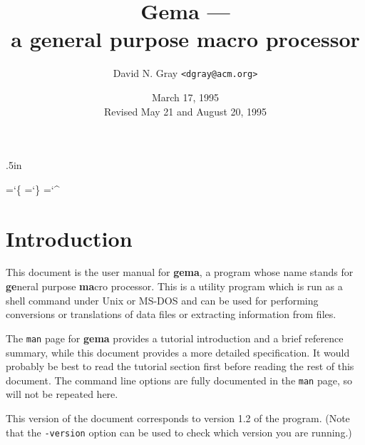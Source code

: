 
\pagestyle{headings}

\oddsidemargin 0.5in \evensidemargin 0.5in
\topmargin 0pt \headsep .5in
\textheight 8.1in \textwidth 6in

\title{\bf Gema --- \\ a general purpose macro processor}
\author{David N. Gray \verb/<dgray@acm.org>/}
\date{March 17, 1995 \\ Revised May 21 and August 20, 1995}



\maketitle

\chardef\ttlb=`\{
\chardef\ttrb=`\}
\chardef\ttcaret=`\^

\section{Introduction}

This document is the user manual for {\bf gema}, a program whose name
stands for {\bf ge}neral purpose {\bf ma}cro processor.
This is a utility program which is run as a shell command under Unix or
MS-DOS and can be used for performing conversions or translations
of data files or extracting information from files.

The {\tt man} page for {\bf gema} provides a tutorial introduction and a
brief reference summary, while this document provides a
more detailed specification.
It would probably be best to read the tutorial section first before
reading the rest of this document.  The command line options are fully
documented in the {\tt man} page, so will not be repeated here.

This version of the document corresponds to version 1.2 of the program.
(Note that the \verb/-version/ option can be used to check which version
you are running.)








